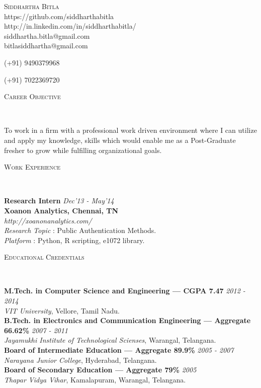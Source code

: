 \documentclass[9pt]{article}
\newenvironment{changemargin}[2]{%
  \begin{list}{}{%
    \setlength{\topsep}{0pt}%
    \setlength{\leftmargin}{#1}%
    \setlength{\rightmargin}{#2}%
    \setlength{\listparindent}{\parindent}%
    \setlength{\itemindent}{\parindent}%
    \setlength{\parsep}{\parskip}%
  }%
  \item[]}{\end{list}
}
\newcommand{\lineover}{
	\begin{changemargin}{-0.05in}{-0.05in}
		\vspace*{-8pt}
		\hrulefill \\
		\vspace*{-2pt}
	\end{changemargin}
}
\newcommand{\header}[1]{
	\begin{changemargin}{-0.5in}{-0.5in}
		\scshape{#1}\\
  	\lineover
	\end{changemargin}
}
\newcommand{\contact}[4]{
	\begin{changemargin}{-0.5in}{-0.5in}
		\begin{center}
			{\Large \scshape {#1}}\\ \smallskip
			{#2}\\ \smallskip 
			{#3}\\ \smallskip
			{#4}\smallskip
		\end{center}
	\end{changemargin}
}
\newenvironment{body} {
	\vspace*{-16pt}
	\begin{changemargin}{-0.25in}{-0.5in}
  }	
	{\end{changemargin}
}
\begin{document}
\contact{Siddhartha Bitla}{https://github.com/siddharthabitla\\http://in.linkedin.com/in/siddharthabitla/}{siddhartha.bitla@gmail.com}{bitlasiddhartha@gmail.com}  \centerline{(+91) 9490379968} \centerline{(+91) 7022369720} 

\smallskip
\header{Career Objective}

\begin{body}
	\vspace{14pt}
	To work in a firm with a professional work driven environment where I can utilize and apply my knowledge, skills which would enable me as a Post-Graduate fresher to grow while fulfilling organizational goals.
\end{body}

\smallskip

\header{Work Experience}

\begin{body}
	\vspace{14pt}
	\textbf{Research Intern}{} \hfill \emph{Dec'13 - May'14} \\
	\textbf{Xoanon Analytics, Chennai, TN}{} \\
	\emph{http://xoanonanalytics.com/} \\
	\textit{Research Topic} : Public Authentication Methods. \\
	\textit{Platform} : Python, R scripting, e1072 library.\\
\end{body}

\smallskip

\header{Educational Credentials}

\begin{body}
	\vspace{14pt}
	\textbf{M.Tech. in Computer Science and Engineering --- CGPA 7.47}{} \hfill \emph{2012 - 2014}{} \\
	\emph{VIT University}, Vellore, Tamil Nadu{}. \\
  \medskip
	\textbf{B.Tech. in Electronics and Communication Engineering --- Aggregate 66.62\%} \hfill \emph{2007 - 2011} \\
	\emph{Jayamukhi Institute of Technological Scienses}, Warangal, Telangana{}.\\
	\medskip
	\textbf{Board of Intermediate Education --- Aggregate 89.9\%} \hfill \emph{2005 - 2007}{} \\
	\emph{Narayana Junior College}, Hyderabad, Telangana{}. \\
	\medskip
	\textbf{Board of Secondary Education --- Aggregate 79\%} \hfill \emph{2005}{} \\
	\emph{Thapar Vidya Vihar}, Kamalapuram, Warangal, Telangana{}. \\

\end{body}
\end{document}

